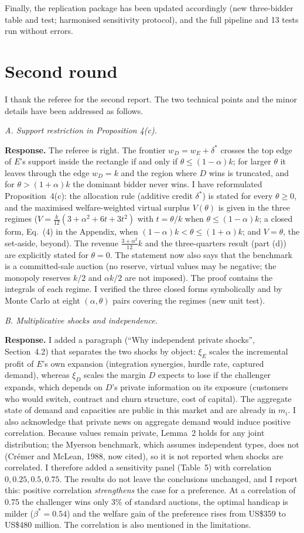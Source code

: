 \documentclass[11pt,a4paper]{article}
\newcommand{\rep}[1]{\par\smallskip\noindent\textbf{Response.} #1\par\bigskip}
\newcommand{\com}[1]{\par\medskip\noindent\textit{#1}\par}
\begin{document}
\bigskip\noindent Finally, the replication package has been updated accordingly (new three-bidder table and test; harmonised sensitivity protocol), and the full pipeline and 13 tests run without errors.


\newpage
\section*{Second round}

I thank the referee for the second report. The two technical points and the minor details have been addressed as follows.

\com{A. Support restriction in Proposition 4(c).}
\rep{The referee is right. The frontier $w_D=w_E+\delta^*$ crosses the top edge of $E$'s support inside the rectangle if and only if $\theta\le(1-\alpha)k$; for larger $\theta$ it leaves through the edge $w_D=k$ and the region where $D$ wins is truncated, and for $\theta>(1+\alpha)k$ the dominant bidder never wins. I have reformulated Proposition~4(c): the allocation rule (additive credit $\delta^*$) is stated for every $\theta\ge0$, and the maximised welfare-weighted virtual surplus $V(\theta)$ is given in the three regimes ($V=\tfrac{k}{12}(3+\alpha^2+6t+3t^2)$ with $t=\theta/k$ when $\theta\le(1-\alpha)k$; a closed form, Eq.~(4) in the Appendix, when $(1-\alpha)k<\theta\le(1+\alpha)k$; and $V=\theta$, the set-aside, beyond). The revenue $\tfrac{3+\alpha^2}{12}k$ and the three-quarters result (part (d)) are explicitly stated for $\theta=0$. The statement now also says that the benchmark is a committed-sale auction (no reserve, virtual values may be negative; the monopoly reserves $k/2$ and $\alpha k/2$ are not imposed). The proof contains the integrals of each regime. I verified the three closed forms symbolically and by Monte Carlo at eight $(\alpha,\theta)$ pairs covering the regimes (new unit test).}

\com{B. Multiplicative shocks and independence.}
\rep{I added a paragraph (``Why independent private shocks'', Section~4.2) that separates the two shocks by object: $\xi_E$ scales the incremental profit of $E$'s own expansion (integration synergies, hurdle rate, captured demand), whereas $\xi_D$ scales the margin $D$ expects to lose if the challenger expands, which depends on $D$'s private information on its exposure (customers who would switch, contract and churn structure, cost of capital). The aggregate state of demand and capacities are public in this market and are already in $m_i$. I also acknowledge that private news on aggregate demand would induce positive correlation. Because values remain private, Lemma~2 holds for any joint distribution; the Myerson benchmark, which assumes independent types, does not (Cr\'emer and McLean, 1988, now cited), so it is not reported when shocks are correlated. I therefore added a sensitivity panel (Table~5) with correlation $0,0.25,0.5,0.75$. The results do not leave the conclusions unchanged, and I report this: positive correlation \emph{strengthens} the case for a preference. At a correlation of 0.75 the challenger wins only 3\% of standard auctions, the optimal handicap is milder ($\beta^*=0.54$) and the welfare gain of the preference rises from US\$359 to US\$480 million. The correlation is also mentioned in the limitations.}
\end{document}
